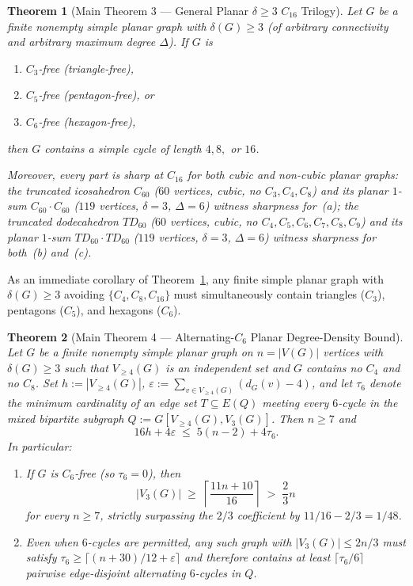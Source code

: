 \documentclass[11pt,reqno]{amsart}
\theoremstyle{plain}
\newtheorem{theorem}{Theorem}[section]
\theoremstyle{definition}
\theoremstyle{remark}
\newcommand{\Vge}{V_{\ge 4}}
\DeclareRobustCommand{\_}{\ifmmode\text{\textunderscore}\else\textunderscore\allowbreak\fi}
\begin{document}
\begin{theorem}[Main Theorem 3 --- General Planar $\delta \ge 3$ $C_{16}$ Trilogy]\label{thm:main3}
Let $G$ be a finite nonempty simple planar graph with $\delta(G) \ge 3$ (of arbitrary connectivity and arbitrary maximum degree $\Delta$). If $G$ is
\begin{enumerate}[label=(\alph*),leftmargin=2.2em]
  \item $C_3$-free (triangle-free),
  \item $C_5$-free (pentagon-free), or
  \item $C_6$-free (hexagon-free),
\end{enumerate}
then $G$ contains a simple cycle of length $4, 8,$ or $16$.

Moreover, every part is sharp at $C_{16}$ for both cubic and non-cubic planar graphs: the truncated icosahedron $C_{60}$ ($60$ vertices, cubic, no $C_3, C_4, C_8$) and its planar $1$-sum $C_{60} \cdot C_{60}$ ($119$ vertices, $\delta = 3$, $\Delta = 6$) witness sharpness for~(a); the truncated dodecahedron $TD_{60}$ ($60$ vertices, cubic, no $C_4, C_5, C_6, C_7, C_8, C_9$) and its planar $1$-sum $TD_{60} \cdot TD_{60}$ ($119$ vertices, $\delta = 3$, $\Delta = 6$) witness sharpness for both~(b) and~(c).
\end{theorem}

As an immediate corollary of Theorem~\ref{thm:main3}, any finite simple planar graph with $\delta(G) \ge 3$ avoiding $\{C_4, C_8, C_{16}\}$ must simultaneously contain triangles ($C_3$), pentagons ($C_5$), and hexagons ($C_6$).

\begin{theorem}[Main Theorem 4 --- Alternating-$C_6$ Planar Degree-Density Bound]\label{thm:main4}
Let $G$ be a finite nonempty simple planar graph on $n = |V(G)|$ vertices with $\delta(G) \ge 3$ such that $\Vge(G)$ is an independent set and $G$ contains no $C_4$ and no $C_8$. Set $h := |\Vge(G)|$, $\varepsilon := \sum_{v \in \Vge(G)} (d_G(v) - 4)$, and let $\tau_6$ denote the minimum cardinality of an edge set $T \subseteq E(Q)$ meeting every $6$-cycle in the mixed bipartite subgraph $Q := G[\Vge(G), V_3(G)]$. Then $n \ge 7$ and
\begin{equation}\label{eq:alt-c6-density}
  16 h + 4 \varepsilon \;\le\; 5(n - 2) + 4 \tau_6.
\end{equation}
In particular:
\begin{enumerate}[label=(\roman*),leftmargin=2.2em]
  \item If $G$ is $C_6$-free (so $\tau_6 = 0$), then
  \begin{equation}\label{eq:v3-density}
    |V_3(G)| \;\ge\; \left\lceil \frac{11 n + 10}{16} \right\rceil \;>\; \frac{2}{3} n
  \end{equation}
  for every $n \ge 7$, strictly surpassing the $2/3$ coefficient by $11/16 - 2/3 = 1/48$.
  \item Even when $6$-cycles are permitted, any such graph with $|V_3(G)| \le 2n/3$ must satisfy $\tau_6 \ge \lceil (n + 30)/12 + \varepsilon \rceil$ and therefore contains at least $\lceil \tau_6 / 6 \rceil$ pairwise edge-disjoint alternating $6$-cycles in $Q$.
\end{enumerate}
\end{theorem}
\end{document}

